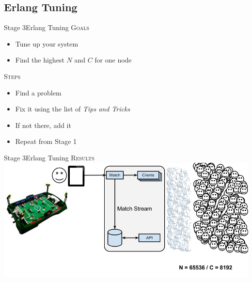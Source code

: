 \documentclass[utf8]{beamer}
\begin{document}
\subsection{Erlang Tuning}
\begin{frame}{Stage 3}{Erlang Tuning}
	\textsc{Goals}
	\begin{itemize}
		\item Tune up \alert{your} system
		\item Find the highest $N$ and $C$ for \alert{one node}
	\end{itemize}
	\pause
	\textsc{Steps}
	\begin{itemize}
		\item Find a problem
		\item Fix it using the list of \emph{Tips and Tricks}
		\item If not there, add it
		\item Repeat \alert{from Stage 1}
	\end{itemize}
\end{frame}
\begin{frame}{Stage 3}{Erlang Tuning}
	\textsc{Results}
	\includegraphics[top=-1,width=\textwidth]{img/MatchStream-3.png}
\end{frame}
\end{document}
